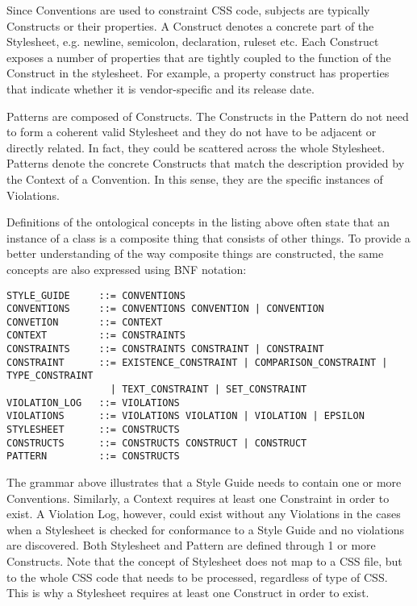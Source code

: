 \documentclass[parskip=full]{uvamscse}
\begin{document}
Since Conventions are used to constraint CSS code, subjects are typically Constructs or their
properties. A Construct denotes a concrete part of the Stylesheet, e.g. newline, semicolon,
declaration, ruleset etc. Each Construct exposes a number of properties that are tightly coupled to
the function of the Construct in the stylesheet. For example, a property construct has properties
that indicate whether it is vendor-specific and its release date.

Patterns are composed of Constructs. The Constructs in the Pattern do not need to form a coherent
valid Stylesheet and they do not have to be adjacent or directly related. In fact, they could be
scattered across the whole Stylesheet. Patterns denote the concrete Constructs that match the
description provided by the Context of a Convention. In this sense, they are the specific instances
of Violations.

Definitions of the ontological concepts in the listing above often state that an instance of a
class is a composite thing that consists of other things. To provide a better understanding of the
way composite things are constructed, the same concepts are also expressed using BNF notation:

\begin{snippet}
\begin{verbatim}
STYLE_GUIDE     ::= CONVENTIONS
CONVENTIONS     ::= CONVENTIONS CONVENTION | CONVENTION 
CONVETION       ::= CONTEXT
CONTEXT         ::= CONSTRAINTS
CONSTRAINTS     ::= CONSTRAINTS CONSTRAINT | CONSTRAINT
CONSTRAINT      ::= EXISTENCE_CONSTRAINT | COMPARISON_CONSTRAINT | TYPE_CONSTRAINT  
                  | TEXT_CONSTRAINT | SET_CONSTRAINT
VIOLATION_LOG   ::= VIOLATIONS
VIOLATIONS      ::= VIOLATIONS VIOLATION | VIOLATION | EPSILON
STYLESHEET      ::= CONSTRUCTS
CONSTRUCTS      ::= CONSTRUCTS CONSTRUCT | CONSTRUCT
PATTERN         ::= CONSTRUCTS
\end{verbatim}
\end{snippet}

The grammar above illustrates that a Style Guide needs to contain one or more Conventions.
Similarly, a Context requires at least one Constraint in order to exist. A Violation Log, however,
could exist without any Violations in the cases when a Stylesheet is checked for conformance to a
Style Guide and no violations are discovered. Both Stylesheet and Pattern are defined through 1 or
more Constructs. Note that the concept of Stylesheet does not map to a CSS file, but to the whole
CSS code that needs to be processed, regardless of type of CSS. This is why a Stylesheet requires at
least one Construct in order to exist.
\end{document}
